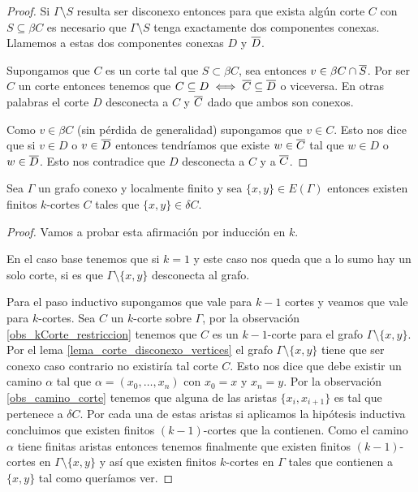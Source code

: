 \documentclass[tesis.tex]{subfiles}
\begin{document}
\begin{proof}
	Si $\Gamma \setminus S$ resulta ser disconexo entonces para que exista algún corte $C$ con $S \subseteq \beta C$ es necesario que $\Gamma \setminus S$ tenga exactamente dos componentes conexas.
	Llamemos a estas dos componentes conexas $D $ y  $\overline D$.
	
	Supongamos que $C$ es un corte tal que $S \subset \beta C$, sea entonces $v \in \beta C \cap \overline S$.
	Por ser $C$ un corte entonces tenemos que $C \subseteq D \iff \overline C \subseteq \overline D$ o viceversa.
	En otras palabras el corte $D$ desconecta a $C$ y $\overline C$ dado que ambos son conexos.
	
	Como $v \in \beta C$ (sin pérdida de generalidad) supongamos que $v \in C$.
	Esto nos dice que si $v \in D$ o $v \in \overline D$ entonces tendríamos que existe $w \in \overline C$ tal que $w \in D$ o $w \in \overline D$.
	Esto nos contradice que $D$ desconecta a $C$ y a $\overline C$.
	
\end{proof}

\begin{prop}\label{lema_aristas_finitos_kcortes}
	Sea $\Gamma$ un grafo conexo y localmente finito y sea $\{x,y\} \in E(\Gamma)$ entonces existen finitos $k$-cortes $C$ tales que $\{x,y\} \in \delta C$.
\end{prop}

\begin{proof}
	Vamos a probar esta afirmación por inducción en $k$.
	
	En el caso base tenemos que si $k=1$ y este caso nos queda que a lo sumo hay un solo corte, si es que $\Gamma \setminus \{x,y\}$ desconecta al grafo.
	
	Para el paso inductivo supongamos que vale para $k-1$ cortes y veamos que vale para $k$-cortes.
	Sea $C$ un $k$-corte sobre $\Gamma$, por la observación \ref{obs_kCorte_restriccion} tenemos que $C$ es un $k-1$-corte para el grafo $\Gamma \setminus \{x,y\}$.
	Por el lema \ref{lema_corte_disconexo_vertices} el grafo $\Gamma \setminus \{x,y\}$ tiene que ser conexo caso contrario no existiría tal corte $C$.
	Esto nos dice que debe existir un camino $\alpha$ tal que $\alpha = (x_{0}, \dots, x_{n})$ con $x_{0} = x$ y $x_{n} = y$.
	Por la observación \ref{obs_camino_corte} tenemos que alguna de las aristas $\{x_{i},x_{i+1}\}$ es tal que pertenece a $\delta C$.
	Por cada una de estas aristas si aplicamos la hipótesis inductiva concluimos que existen finitos $(k-1)$-cortes que la contienen.
	Como el camino $\alpha$ tiene finitas aristas entonces tenemos finalmente que existen finitos $(k-1)$-cortes en $\Gamma \setminus \{x,y\}$ y así que existen finitos $k$-cortes en $\Gamma$ tales que contienen a $\{x,y\}$ tal como queríamos ver.
	
\end{proof}
\end{document}

